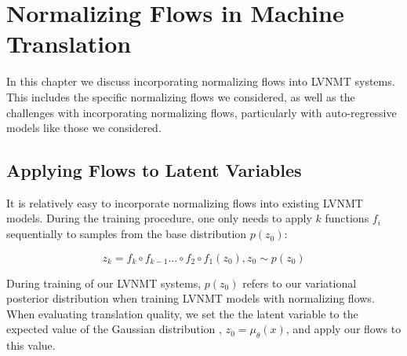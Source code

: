 \chapter{Normalizing Flows in Machine Translation}


In this chapter we discuss incorporating normalizing flows into \ac{LVNMT} systems. This includes the specific normalizing flows we considered, as well as the challenges with incorporating normalizing flows, particularly with auto-regressive models like those we considered.

\section{Applying Flows to Latent Variables}


It is relatively easy to incorporate normalizing flows into existing LVNMT models. During the training procedure, one only needs to apply $k$ functions $f_{i}$ sequentially to samples from the base distribution $p(z_{0})$: 

\begin{equation}
z_{k} = f_{k} \circ f_{k-1} ... \circ f_{2} \circ f_{1}(z_{0}) , z_{0} \sim p(z_{0})
\end{equation}

During training of our \ac{LVNMT} systems, $p(z_{0})$ refers to our variational posterior distribution when training \ac{LVNMT} models with normalizing flows. When evaluating translation quality, we set the the latent variable to the expected value of the Gaussian distribution , $z_{0} = \mu_{\theta}(x)$, and apply our flows to this value.


